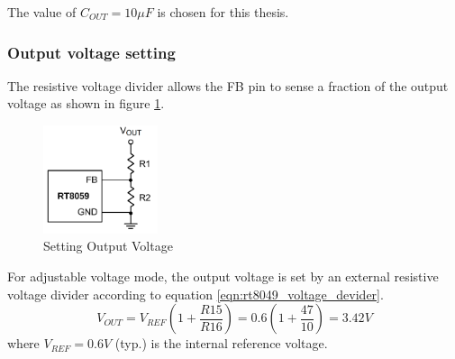 \documentclass[\main/main.tex]{subfiles}
\begin{document}
The value of $C_{OUT} = 10\mu F$ is chosen for this thesis.

\subsubsection{Output voltage setting}
The resistive voltage divider allows the FB pin to sense a fraction of the output voltage as shown in figure \ref{fig:rt8049_setting_output_voltage}.
\begin{figure}[H]
    \begin{center}
        \includegraphics[width=0.3\textwidth]{rt8049_setting_output_voltage.png}
    \end{center}
    \caption{Setting Output Voltage}
    \label{fig:rt8049_setting_output_voltage}
\end{figure}

For adjustable voltage mode, the output voltage is set by an external resistive voltage divider according to equation \ref{eqn:rt8049_voltage_devider}.
\begin{equation}
    V_{OUT} = V_{REF} (1 + \frac{R15}{R16}) = 0.6 (1 + \frac{47}{10}) = 3.42V
    \label{eqn:rt8049_voltage_devider}
\end{equation}
where $V_{REF} = 0.6V$ (typ.) is the internal reference voltage.
\end{document}
